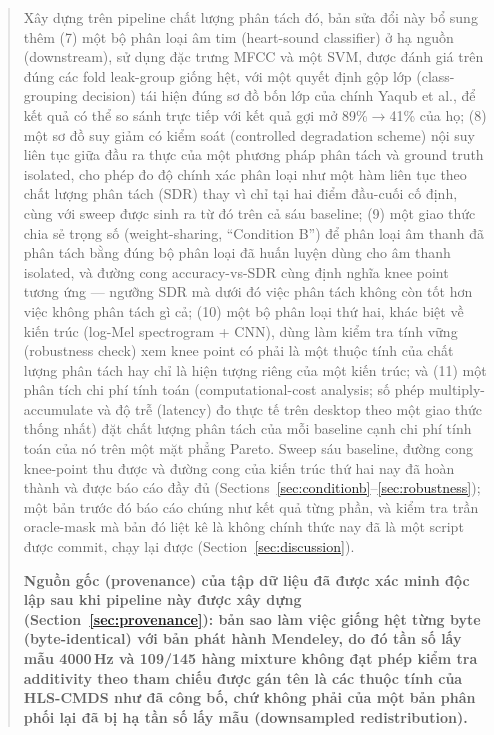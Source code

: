 \documentclass[11pt]{article}
\begin{document}
\begin{abstract}
Xây dựng trên pipeline chất lượng phân tách đó, bản sửa đổi này bổ sung
thêm (7) một bộ phân loại âm tim (heart-sound classifier) ở hạ nguồn
(downstream), sử dụng đặc trưng MFCC và một SVM, được đánh giá trên đúng
các fold leak-group giống hệt, với một quyết định gộp lớp (class-grouping
decision) tái hiện đúng sơ đồ bốn lớp của chính Yaqub et al., để kết quả
có thể so sánh trực tiếp với kết quả gợi mở 89\%$\to$41\% của họ; (8) một
sơ đồ suy giảm có kiểm soát (controlled degradation scheme) nội suy liên
tục giữa đầu ra thực của một phương pháp phân tách và ground truth isolated,
cho phép đo độ chính xác phân loại như một hàm liên tục theo chất lượng
phân tách (SDR) thay vì chỉ tại hai điểm đầu-cuối cố định, cùng với sweep
được sinh ra từ đó trên cả sáu baseline; (9) một giao thức chia sẻ trọng số
(weight-sharing, ``Condition B'') để phân loại âm thanh đã phân tách bằng
đúng bộ phân loại đã huấn luyện dùng cho âm thanh isolated, và đường cong
accuracy-vs-SDR cùng định nghĩa knee point tương ứng --- ngưỡng SDR mà dưới
đó việc phân tách không còn tốt hơn việc không phân tách gì cả; (10) một
bộ phân loại thứ hai, khác biệt về kiến trúc (log-Mel spectrogram + CNN),
dùng làm kiểm tra tính vững (robustness check) xem knee point có phải là
một thuộc tính của chất lượng phân tách hay chỉ là hiện tượng riêng của
một kiến trúc; và (11) một phân tích chi phí tính toán (computational-cost
analysis; số phép multiply-accumulate và độ trễ (latency) đo thực tế trên
desktop theo một giao thức thống nhất) đặt chất lượng phân tách của mỗi
baseline cạnh chi phí tính toán của nó trên một mặt phẳng Pareto. Sweep
sáu baseline, đường cong knee-point thu được và đường cong của kiến trúc
thứ hai nay đã hoàn thành và được báo cáo đầy đủ
(Sections~\ref{sec:conditionb}--\ref{sec:robustness}); một bản trước đó
báo cáo chúng như kết quả từng phần, và kiểm tra trần oracle-mask mà bản
đó liệt kê là không chính thức nay đã là một script được commit, chạy lại
được (Section~\ref{sec:discussion}).

\textbf{Nguồn gốc (provenance) của tập dữ liệu đã được xác minh độc lập
sau khi pipeline này được xây dựng (Section~\ref{sec:provenance}): bản sao
làm việc giống hệt từng byte (byte-identical) với bản phát hành Mendeley,
do đó tần số lấy mẫu 4000\,Hz và 109/145 hàng mixture không đạt phép kiểm
tra additivity theo tham chiếu được gán tên là các thuộc tính của HLS-CMDS như đã công bố, chứ không phải của
một bản phân phối lại đã bị hạ tần số lấy mẫu (downsampled redistribution).}
\end{abstract}
\end{document}
